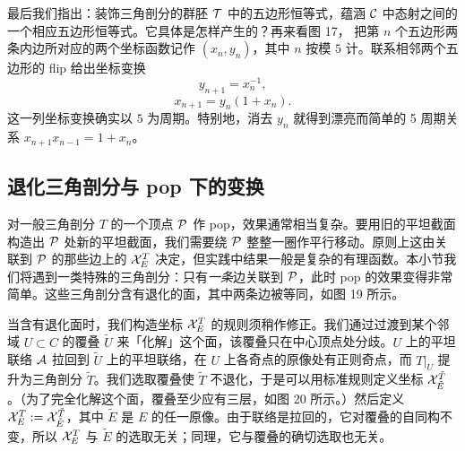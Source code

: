 最后我们指出：装饰三角剖分的群胚 $\mathcal{T}$ 中的五边形恒等式，蕴涵 $\mathcal{C}$ 中态射之间的一个相应五边形恒等式。它具体是怎样产生的？再来看图 17，%
把第 $n$ 个五边形两条内边所对应的两个坐标函数记作 $(x_n,y_n)$，其中 $n$ 按模 $5$ 计。联系相邻两个五边形的 flip 给出坐标变换
\begin{equation}
y_{n+1} = x_n^{-1},
\end{equation}
\begin{equation}
x_{n+1} = y_n(1+x_n).
\end{equation}
这一列坐标变换确实以 $5$ 为周期。特别地，消去 $y_n$ 就得到漂亮而简单的 5 周期关系 $x_{n+1}x_{n-1}=1+x_n$。

\subsection{退化三角剖分与 pop 下的变换}
\label{sec:degenerate}

对一般三角剖分 $T$ 的一个顶点 $\mathcal{P}$ 作 pop，效果通常相当复杂。要用旧的平坦截面构造出 $\mathcal{P}$ 处新的平坦截面，我们需要绕 $\mathcal{P}$ 整整一圈作平行移动。原则上这由关联到 $\mathcal{P}$ 的那些边上的 $\mathcal{X}^T_E$ 决定，但实践中结果一般是复杂的有理函数。本小节我们将遇到一类特殊的三角剖分：只有\emph{一条}边关联到 $\mathcal{P}$，此时 pop 的效果变得非常简单。这些三角剖分含有退化的面，其中两条边被等同，如图 19%
所示。

当含有退化面时，我们构造坐标 $\mathcal{X}^T_E$ 的规则须稍作修正。我们通过过渡到某个邻域 $U\subset C$ 的覆叠 $\tilde U$ 来「化解」这个面，该覆叠只在中心顶点处分歧。$U$ 上的平坦联络 $\mathcal{A}$ 拉回到 $\tilde U$ 上的平坦联络，在 $U$ 上各奇点的原像处有正则奇点，而 $T|_U$ 提升为三角剖分 $\tilde T$。我们选取覆叠使 $\tilde T$ 不退化，于是可以用标准规则定义坐标 $\mathcal{X}^{\tilde T}_{\tilde E}$。（为了完全化解这个面，覆叠至少应有三层，如图 20%
所示。）然后定义 $\mathcal{X}^T_E:=\mathcal{X}^{\tilde T}_{\tilde E}$，其中 $\tilde E$ 是 $E$ 的任一原像。由于联络是拉回的，它对覆叠的自同构不变，所以 $\mathcal{X}^T_E$ 与 $\tilde E$ 的选取无关；同理，它与覆叠的确切选取也无关。



